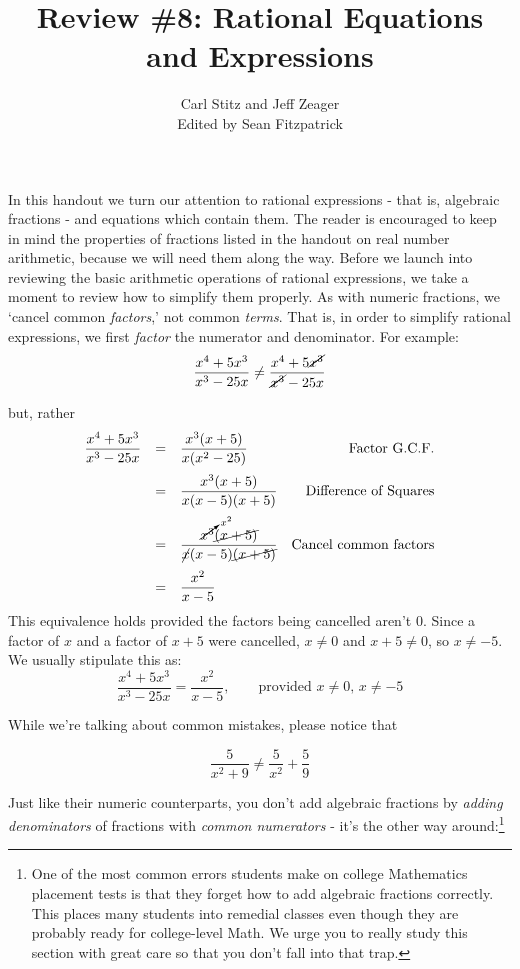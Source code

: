 \documentclass[11pt]{article}
\title{Review \#8: Rational Equations and Expressions}
\author{Carl Stitz and Jeff Zeager\\
Edited by Sean Fitzpatrick}
\theoremstyle{definition}  %
\begin{document}
\maketitle


\renewcommand{\headrulewidth}{0pt}
\renewcommand{\headheight}{14pt}
\lhead[\fancyplain{}{\sc\thepage}]%
      {\fancyplain{}{\sc \nouppercase{\rightmark}}}
\rhead[\fancyplain{}{\sc \nouppercase{\leftmark}}]%
      {\fancyplain{}{\sc\thepage}}
\cfoot{}

In this handout we turn our attention to rational expressions - that is, algebraic fractions - and equations which contain them.  The reader is encouraged to keep in mind the properties of fractions listed in the handout on real number arithmetic, because we will need them along the way.  Before we launch into reviewing the basic arithmetic operations of rational expressions, we take a moment to review how to simplify them properly.  As with numeric fractions, we `cancel common \textit{factors},' not common \textit{terms}.  That is, in order to simplify rational expressions, we first \textit{factor} the numerator and denominator.  For example:  \[ \dfrac{x^4 + 5x^3}{x^3 - 25x} \neq \dfrac{x^4 + 5\cancel{x^3}}{\cancel{x^3} - 25x} \]

but, rather \[ \begin{array}{rclr}

\dfrac{x^4 + 5x^3}{x^3 - 25x} & = & \dfrac{x^3(x + 5)}{x(x^2-25)} & \text{Factor G.C.F.} \\ [12pt]
                             & = & \dfrac{x^3(x + 5)}{x(x-5)(x+5)} & \text{Difference of Squares} \\ [12pt]
														& = & \dfrac{\cancelto{x^2}{x^3}\cancel{(x + 5)}}{\cancel{x}(x-5)\cancel{(x+5)}} & \text{Cancel common factors}\\ [12pt]                         
														& = & \dfrac{x^2}{x-5} & \\ \end{array}\] This equivalence holds provided the factors being cancelled aren't $0$. Since a factor of $x$ and a factor of $x+5$ were cancelled, $x \neq 0$ and $x+5 \neq 0$, so $x \neq -5$.   We usually stipulate this as: \[ \dfrac{x^4 + 5x^3}{x^3 - 25x}  = \dfrac{x^2}{x-5}, \qquad \text{provided $x \neq 0$, $x \neq -5$} \]

While we're talking about common mistakes, please notice that 

\[ \dfrac{5}{x^2+9} \neq \dfrac{5}{x^2} + \dfrac{5}{9} \] 

Just like their numeric counterparts, you don't add algebraic fractions by \textit{adding denominators} of fractions with \textit{common numerators} - it's the other way around:\footnote{One of the most common errors students make on college Mathematics placement tests is that they forget how to add algebraic fractions correctly.  This places many students into remedial classes even though they are probably ready for college-level Math.  We urge you to really study this section with great care so that you don't fall into that trap.} 
\end{document}
